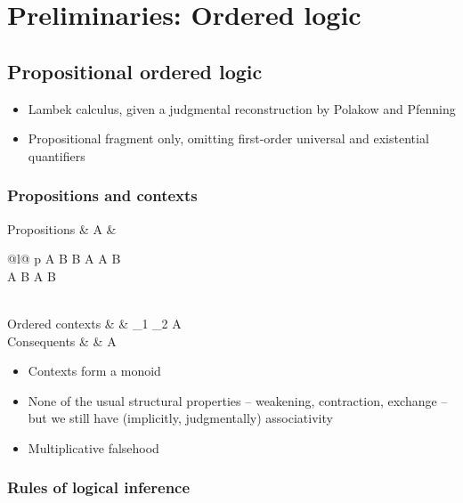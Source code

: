 \chapter{Preliminaries: Ordered logic}\label{ch:ordered-logic}

\section{Propositional ordered logic}

\begin{itemize}
\item Lambek calculus, given a judgmental reconstruction by Polakow and Pfenning
\item Propositional fragment only, omitting first-order universal and existential quantifiers
\end{itemize}


\subsection{Propositions and contexts}

\begin{syntax*}
  Propositions &
    A & \begin{array}[t]{@{}l@{}}
          p \mid A \limp B \mid B \pmir A \mid \bot
            \mid A \fuse B \mid \one \\
          \mathllap{\mid {}} A \with B \mid \top
            \mid A \plus B \mid \zero
        \end{array}
  \\
  Ordered contexts &
    \octx & \octxe \mid \octx_1 \oc \octx_2 \mid A
  \\
  Conseq\relax uents &
    \cseq & A \mid \octxe
\end{syntax*}

\begin{itemize}
\item Contexts form a monoid
\item None of the usual structural properties -- weakening, contraction, exchange -- but we still have (implicitly, judgmentally) associativity
\item Multiplicative falsehood
\end{itemize}

\subsection{Rules of logical inference}

